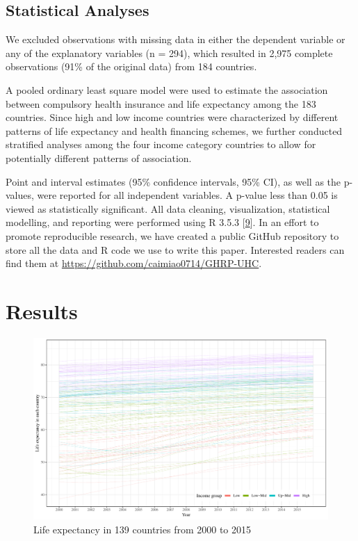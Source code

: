\documentclass[]{elsarticle} %
\makeatletter
\def\maxwidth{\ifdim\Gin@nat@width>\linewidth\linewidth
\else\Gin@nat@width\fi}
\let\Oldincludegraphics\includegraphics
\renewcommand{\includegraphics}[1]{\Oldincludegraphics[width=\maxwidth]{#1}}
\makeatother
\begin{document}
\hypertarget{statistical-analyses}{%
\subsection{Statistical Analyses}\label{statistical-analyses}}

We excluded observations with missing data in either the dependent variable or any of the explanatory variables (n = 294), which resulted in 2,975 complete observations (91\% of the original data) from 184 countries.

A pooled ordinary least square model were used to estimate the association between compulsory health insurance and life expectancy among the 183 countries. Since high and low income countries were characterized by different patterns of life expectancy and health financing schemes, we further conducted stratified analyses among the four income category countries to allow for potentially different patterns of association.

Point and interval estimates (95\% confidence intervals, 95\% CI), as well as the p-values, were reported for all independent variables.
A p-value less than 0.05 is viewed as statistically significant.
All data cleaning, visualization, statistical modelling, and reporting were performed using R 3.5.3 {[}\protect\hyperlink{ref-R353}{9}{]}.
In an effort to promote reproducible research, we have created a public GitHub repository to store all the data and R code we use to write this paper.
Interested readers can find them at \url{https://github.com/caimiao0714/GHRP-UHC}.

\hypertarget{results}{%
\section{Results}\label{results}}

\begin{figure}
\centering
\includegraphics{Figures/fig1.pdf}
\caption{\label{fig:fig1}Life expectancy in 139 countries from 2000 to 2015}
\end{figure}
\end{document}
